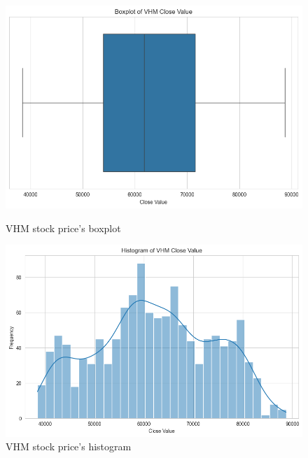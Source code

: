\documentclass{ieeeojies}
\begin{document}
\begin{figure}[H]
  \centering
  \begin{minipage}{0.23\textwidth}
  \centering
  \includegraphics[width=1\textwidth]{bibliography/Figure/VHMBoxPlot.png}
  \caption{VHM stock price's boxplot}
  \label{fig:1}
  \end{minipage}
  \hfill
  \begin{minipage}{0.23\textwidth}
  \centering
  \includegraphics[width=1\textwidth]{bibliography/Figure/VHMhist.png}
  \caption{VHM stock price's histogram}
  \label{fig:2}
  \end{minipage}
\end{figure}
\end{document}
